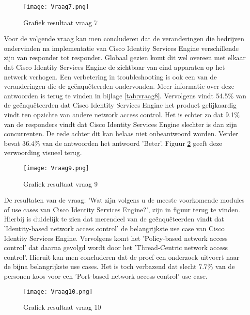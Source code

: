 \begin{figure}[H]
	\centering
	\texttt{[image: Vraag7.png]}
	\caption{Grafiek resultaat vraag 7}
	\label{fig:vraag7}
\end{figure}

Voor de volgende vraag kan men concluderen dat de veranderingen die bedrijven ondervinden na implementatie van Cisco Identity Services Engine verschillende zijn van responder tot responder. Globaal gezien komt dit wel overeen met elkaar dat Cisco Identity Services Engine de zichtbaar van eind apparaten op het netwerk verhogen. Een verbetering in troubleshooting is ook een van de veranderingen die de geënquêteerden ondervonden. Meer informatie over deze antwoorden is terug te vinden in bijlage \ref{tab:vraag8}. Vervolgens vindt 54.5\% van de geënquêteerden dat Cisco Identity Services Engine het product gelijkaardig vindt ten opzichte van andere network access control. Het is echter zo dat 9.1\% van de responders vindt dat Cisco Identity Services Engine slechter is dan zijn concurrenten. De rede achter dit kan helaas niet onbeantwoord worden. Verder bevat 36.4\% van de antwoorden het antwoord 'Beter'. Figuur \ref{fig:vraag9} geeft deze verwoording visueel terug. 

\begin{figure}[H]
	\centering
	\texttt{[image: Vraag9.png]}
	\caption{Grafiek resultaat vraag 9}
	\label{fig:vraag9}
\end{figure}

De resultaten van de vraag: 'Wat zijn volgens u de meeste voorkomende modules of use cases van Cisco Identity Services Engine?', zijn in figuur \label{fig:vraag10} terug te vinden. Hierbij is duidelijk te zien dat merendeel van de geënquêteerden vindt dat 'Identity-based network access control' de belangrijkste use case van Cisco Identity Services Engine. Vervolgens komt het 'Policy-based network access control' dat daarna gevolgd wordt door het 'Thread-Centric network access control'. Hieruit kan men concluderen dat de proef een onderzoek uitvoert naar de bijna belangrijkste use cases. Het is toch verbazend dat slecht 7.7\% van de personen koos voor een 'Port-based network access control' use case. 

\begin{figure}[H]
	\centering
	\texttt{[image: Vraag10.png]}
	\caption{Grafiek resultaat vraag 10}
\end{figure}

